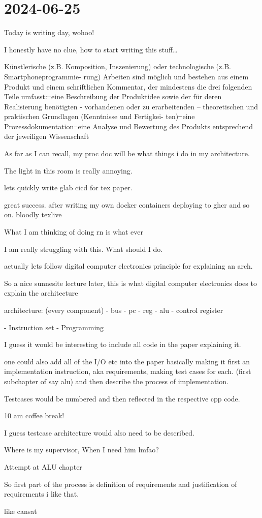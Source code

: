 \section{2024-06-25} %
\label{sec:2024-06-25}
Today is writing day, wohoo!

I honestly have no clue, how to start writing this stuff\dots

Künstlerische (z.B. Komposition, Inszenierung) oder technologische (z.B. Smartphoneprogrammie-
rung) Arbeiten sind möglich und bestehen aus einem Produkt und einem schriftlichen Kommentar,
der mindestens die drei folgenden Teile umfasst:
̶ eine Beschreibung der Produktidee sowie der für deren Realisierung benötigten - vorhandenen
oder zu erarbeitenden – theoretischen und praktischen Grundlagen (Kenntnisse und Fertigkei-
ten)
̶ eine Prozessdokumentation
̶ eine Analyse und Bewertung des Produkts entsprechend der jeweiligen Wissenschaft

As far as I can recall, my proc doc will be what things i do in my architecture. 

The light in this room is really annoying.

lets quickly write glab cicd for tex paper.

great success. after writing my own docker containers deploying to ghcr and so on. bloodly texlive



What I am thinking of doing rn is what ever

I am really struggling with this. What should I do. 

actually lets follow digital computer electronics principle for explaining an arch. 


So a nice sunnesite lecture later, this is what digital computer electronics does to explain the architecture

architecture:
(every component)
- bus
- pc
- reg
- alu
- control register 

- Instruction set
- Programming

I guess it would be interesting to include all code in the paper explaining it. 

one could also add all of the I/O etc into the paper
basically making it first an implementation instruction, aka requirements, making test cases for each. (first subchapter of say alu) and then describe the process of implementation. 

Testcases would be numbered and then reflected in the respective cpp code. 

10 am coffee break!

I guess testcase architecture would also need to be described. 

Where is my supervisor, When I need him lmfao?

Attempt at ALU chapter

So first part of the process is definition of requirements and justification of requirements
i like that. 

like cansat

